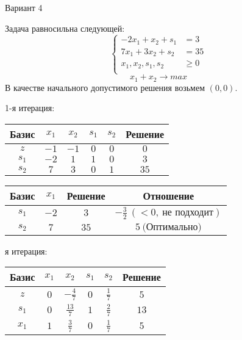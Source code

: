 \documentclass{article}%
\begin{document}
\begin{center}%
\begin{Huge}%
Вариант 4%
\end{Huge}%
\end{center}%
Задача равносильна следующей: %
\[%
\left\{\begin{aligned}-2x_{1}+x_{2}+s_{1} & =3 \\7x_{1}+3x_{2}+s_{2} & =35 \\x_{1},x_{2},s_{1},s_{2} & \ge 0 \\ \end{aligned}\right.%
\]%
\[%
x_{1}+x_{2}  \to max%
\]%
В качестве начального допустимого решения возьмем %
$(0, 0).$%
\begin{flushleft}%
1{-}я итерация: %
\newline%
\newline%
\renewcommand{\arraystretch}{1.3}%
\begin{tabular}{|c|cccc|c|}%
\hline%
Базис&$x_{1}$&$x_{2}$&$s_{1}$&$s_{2}$&Решение\\%
\hline%
$z$&$-1$&$-1$&$0$&$0$&$0$\\%
\hline%
$s_{1}$&$-2$&$1$&$1$&$0$&$3$\\%
$s_{2}$&$7$&$3$&$0$&$1$&$35$\\%
\hline%
\end{tabular}%
\newline%
\newline%
\newline%
\begin{tabular}{|cccc|}%
\hline%
Базис&$x_{1}$&Решение&Отношение\\%
\hline%
$s_{1}$&$-2$&$3$&$-\frac{3}{2}\: (< 0, \: \text{не подходит})$\\%
$s_{2}$&$7$&$35$&$5\: \text{(Оптимально)}$\\%
\hline%
\end{tabular}%
\newline%
\newline%
я итерация: %
\newline%
\newline%
\renewcommand{\arraystretch}{1.3}%
\begin{tabular}{|c|cccc|c|}%
\hline%
Базис&$x_{1}$&$x_{2}$&$s_{1}$&$s_{2}$&Решение\\%
\hline%
$z$&$0$&$-\frac{4}{7}$&$0$&$\frac{1}{7}$&$5$\\%
\hline%
$s_{1}$&$0$&$\frac{13}{7}$&$1$&$\frac{2}{7}$&$13$\\%
$x_{1}$&$1$&$\frac{3}{7}$&$0$&$\frac{1}{7}$&$5$\\%

\end{tabular}
\end{flushleft}
\end{document}
